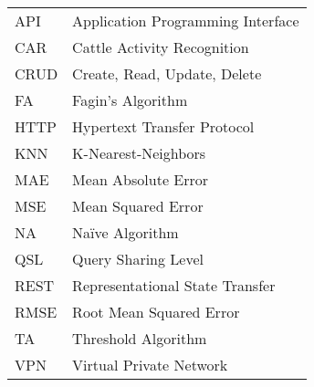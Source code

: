 \begin{longtable}[l]{ll}

API & Application Programming Interface \\
CAR & Cattle Activity Recognition \\
CRUD & Create, Read, Update, Delete \\
FA & Fagin's Algorithm \\
HTTP & Hypertext Transfer Protocol \\
KNN & K-Nearest-Neighbors \\
MAE & Mean Absolute Error \\
MSE & Mean Squared Error \\
NA & Naïve Algorithm \\
QSL & Query Sharing Level \\
REST & Representational State Transfer \\
RMSE & Root Mean Squared Error \\
TA & Threshold Algorithm \\
VPN & Virtual Private Network \\

\end{longtable}
